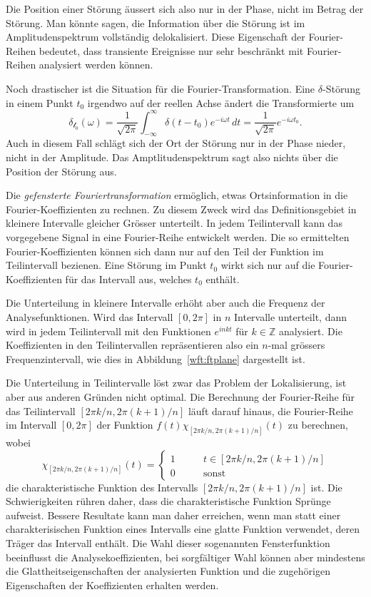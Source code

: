 Die Position einer Störung äussert sich also nur in der Phase, nicht
im Betrag der Störung.
Man könnte sagen, die Information über die Störung ist im Amplitudenspektrum
vollständig delokalisiert.
Diese Eigenschaft der Fourier-Reihen bedeutet, dass transiente Ereignisse
nur sehr beschränkt mit Fourier-Reihen analysiert werden können.

Noch drastischer ist die Situation für die Fourier-Transformation.
Eine $\delta$-Störung in einem Punkt $t_0$ irgendwo auf der reellen Achse
ändert die Transformierte um
\[
\mathcal{\delta_{t_0}}(\omega)
=
\frac{1}{\sqrt{2\pi}} \int_{-\infty}^\infty \delta(t-t_0) e^{-i\omega t}\,dt
=
\frac1{\sqrt{2\pi}} e^{-i\omega t_0}.
\]
Auch in diesem Fall schlägt sich der Ort der Störung nur in der Phase nieder,
nicht in der Amplitude.
Das Amptlitudenspektrum sagt also nichts über die Position der
Störung aus.

Die {\em gefensterte Fouriertransformation} ermöglich, etwas Ortsinformation
in die Fourier-Koeffizienten zu rechnen.
Zu diesem Zweck wird das Definitionsgebiet in kleinere Intervalle gleicher
Grösser unterteilt.
In jedem Teilintervall kann das vorgegebene Signal in eine Fourier-Reihe
entwickelt werden.
Die so ermittelten Fourier-Koeffizienten können sich dann nur auf den Teil
der Funktion im Teilintervall bezienen.
Eine Störung im Punkt $t_0$ wirkt sich nur auf die Fourier-Koeffizienten
für das Intervall aus, welches $t_0$ enthält.

Die Unterteilung in kleinere Intervalle erhöht aber auch die Frequenz
der Analysefunktionen.
Wird das Intervall $[0,2\pi]$ in $n$ Intervalle unterteilt, dann wird in
jedem Teilintervall mit den Funktionen $e^{inkt}$ für $k\in\mathbb Z$
analysiert.
Die Koeffizienten in den Teilintervallen repräsentieren also ein $n$-mal
grössers Frequenzintervall, wie dies in Abbildung~\ref{wft:ftplane}
dargestellt ist.

Die Unterteilung in Teilintervalle löst zwar das Problem der Lokalisierung,
ist aber aus anderen Gründen nicht optimal.
Die Berechnung der Fourier-Reihe für das Teilintervall $[2\pi k/n, 2\pi(k+1)/n]$
läuft darauf hinaus, die Fourier-Reihe im Intervall $[0,2\pi]$ der Funktion
$f(t) \chi_{[2\pi k/n, 2\pi(k+1)/n]}(t)$
zu berechnen, wobei 
\[
\chi_{[2\pi k/n, 2\pi(k+1)/n]}(t)
=
\begin{cases}
1&\qquad t \in [2\pi k/n, 2\pi(k+1)/n]\\
0&\qquad\text{sonst}
\end{cases}
\]
die charakteristische Funktion des Intervalls $[2\pi k/n, 2\pi(k+1)/n]$
ist.
Die Schwierigkeiten rühren daher, dass die charakteristische
Funktion Sprünge aufweist.
Bessere Resultate kann man daher erreichen, wenn man statt einer
charakterisischen Funktion eines Intervalls eine glatte Funktion
verwendet, deren Träger das Intervall enthält.
Die Wahl dieser sogenannten Fensterfunktion beeinflusst die
Analysekoeffizienten, bei sorgfältiger Wahl können aber mindestens
die Glattheitseigenschaften der analysierten Funktion und die zugehörigen
Eigenschaften der Koeffizienten erhalten werden.

